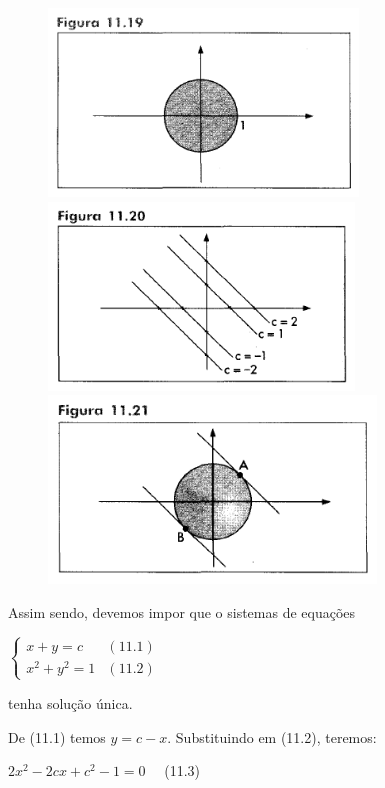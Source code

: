 		\begin{figure}[H]
			\includegraphics[height=5cm]{images/morettin_figura-11-19}
			\includegraphics[height=5cm]{images/morettin_figura-11-20}
			\includegraphics[height=5cm]{images/morettin_figura-11-21}
		\end{figure}

		Assim sendo, devemos impor que o sistemas de equações

		\bigskip

		$
		\begin{cases}
			x + y = c & (11.1)\\
			x^{2} + y^{2} = 1 & (11.2)
		\end{cases}
		$

		\bigskip

		tenha solução única.

		\medskip

		De (11.1) temos $y = c - x$. Substituindo em (11.2), teremos:

		\medskip

		$2x^{2} - 2cx + c^{2} - 1 = 0$ \ \ (11.3)

